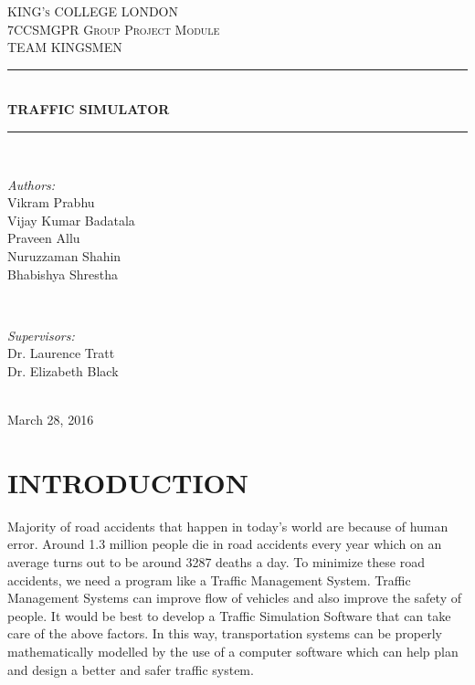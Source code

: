 \documentclass[11pt,a4paper]{article}
\begin{document}
\begin{titlepage}

\newcommand{\HRule}{\rule{\linewidth}{0.5mm}} 

\center 

\textsc{\LARGE KING's COLLEGE LONDON}\\[1.5cm] 
\textsc{\Large 7CCSMGPR Group Project Module}\\[0.5cm] 
\textsc{\large TEAM KINGSMEN}\\[0.5cm] 

\HRule \\[0.4cm]
{ \huge \bfseries TRAFFIC SIMULATOR}\\[0.4cm] 
\HRule \\[1.5cm]

\begin{minipage}{0.4\textwidth}
\begin{flushleft} \large
\emph{Authors:}\\
Vikram Prabhu \\
Vijay Kumar Badatala \\
Praveen Allu \\
Nuruzzaman Shahin \\
Bhabishya Shrestha \\
\end{flushleft}
\end{minipage}
~
\begin{minipage}{0.4\textwidth}
\begin{flushright} \large
\emph{Supervisors:} \\
Dr. Laurence Tratt \\
Dr. Elizabeth Black
\end{flushright}
\end{minipage}\\[4cm]

{\large March 28, 2016}\\[6cm]

\end{titlepage}

\tableofcontents

\newpage

\section{INTRODUCTION}

Majority of road accidents that happen in today’s world are because of human error. Around 1.3 million people die in road accidents every year which on an average turns out to be around 3287 deaths a day. To minimize these road accidents, we need a program like a Traffic Management System. Traffic Management Systems can improve flow of vehicles and also improve the safety of people. It would be best to develop a Traffic Simulation Software that can take care of the above factors. In this way, transportation systems can be properly mathematically modelled by the use of a computer software which can help plan and design a better and safer traffic system.
\end{document}
